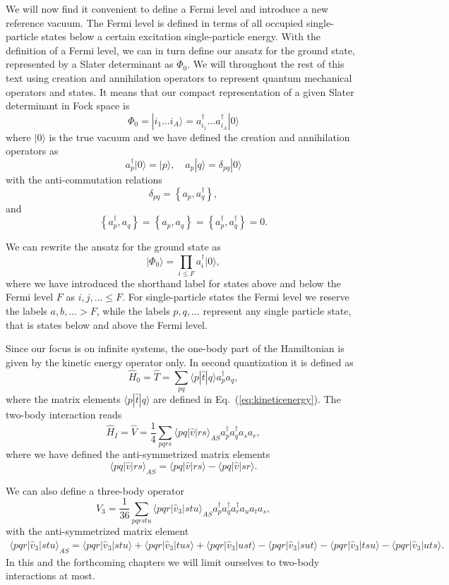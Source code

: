 We will now find it convenient to define a Fermi level and introduce a new reference vacuum. The Fermi level is defined in terms of all occupied single-particle states  below a certain excitation single-particle energy. 
With the definition of  a Fermi level, we can in turn define our ansatz for the ground state, represented by a Slater determinant
as $\Phi_0$.  We will throughout the rest of this text using creation and annihilation operators to represent quantum mechanical operators and states.
It means that our compact representation of a given Slater determinant in Fock space \cite{shavittbartlett2009} is
\[
  \Phi_{0}=|i_1 \dots i_A\rangle= a_{i_1}^{\dagger} \dots a_{i_A}^{\dagger} |0\rangle
\]
where $\vert 0\rangle$ is the true vacuum and we have defined the creation and annihilation operators as
    \[
        a_p^\dagger|0\rangle = |p\rangle, \quad a_p |q\rangle = \delta_{pq}|0\rangle
    \]
with the anti-commutation relations
\[
  \delta_{pq} = \left\{a_p, a_q^\dagger \right\},
\]
and 
\[
\left\{a_p^\dagger, a_q \right\} = \left\{a_p, a_q \right\} = \left\{a_p^\dagger, a_q^\dagger \right\}=0.
\]

We can rewrite the ansatz for the ground state as
\[
\vert\Phi_0\rangle = \prod_{i\le F}a_{i}^{\dagger} |0\rangle,
\]
where we have introduced the shorthand label for states above and below the Fermi level $F$ as
$i,j,\ldots \leq F$. For single-particle states the Fermi level we reserve the labels $a,b,\ldots > F$, while the labels $p,q, \ldots$
represent any single particle state, that is states below and above the Fermi level. 

Since our focus is on infinite systems, the one-body part of the Hamiltonian is given by the kinetic energy operator only.
In second quantization it is defined as
\[
\hat{H}_0=\hat{T} = \sum_{pq} \langle p|\hat{t}|q\rangle a_p^\dagger a_q,
\]
where the matrix elements $\langle p|\hat{t}|q\rangle$ are defined in Eq.~(\ref{eq:kineticenergy}). 
The two-body interaction  reads
\[
\hat{H}_I=\hat{V} = \frac{1}{4} \sum_{pqrs} \langle pq|\hat{v}|rs\rangle_{AS} a_p^\dagger a_q^\dagger a_s a_r,
\]
where we have defined the anti-symmetrized matrix elements
\[
\langle pq|\hat{v}|rs\rangle_{AS} = \langle pq|\hat{v}|rs\rangle - \langle pq|\hat{v}|sr\rangle.
\]

We can also define a three-body operator
\[
\hat{V}_3 = \frac{1}{36} \sum_{pqrstu} \langle pqr|\hat{v}_3|stu\rangle_{AS} 
                a_p^\dagger a_q^\dagger a_r^\dagger a_u a_t a_s,
\]
with the anti-symmetrized matrix element
\begin{align}
            \langle pqr|\hat{v}_3|stu\rangle_{AS} = \langle pqr|\hat{v}_3|stu\rangle + \langle pqr|\hat{v}_3|tus\rangle + \langle pqr|\hat{v}_3|ust\rangle- \langle pqr|\hat{v}_3|sut\rangle - \langle pqr|\hat{v}_3|tsu\rangle - \langle pqr|\hat{v}_3|uts\rangle.
\end{align}
In this and the forthcoming chapters we will limit ourselves to two-body interactions at most. 

